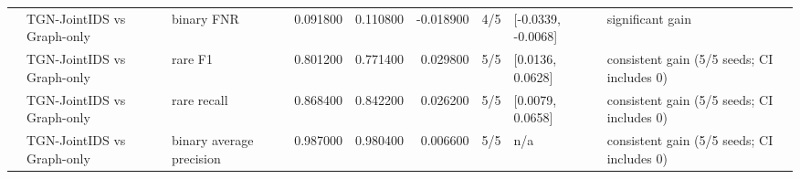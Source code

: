\begin{table}
\begin{tabular}{lllrrrlll}
 & TGN-JointIDS vs Graph-only & binary FNR & 0.091800 & 0.110800 & -0.018900 & 4/5 & [-0.0339, -0.0068] & significant gain \\
 & TGN-JointIDS vs Graph-only & rare F1 & 0.801200 & 0.771400 & 0.029800 & 5/5 & [0.0136, 0.0628] & consistent gain (5/5 seeds; CI includes 0) \\
 & TGN-JointIDS vs Graph-only & rare recall & 0.868400 & 0.842200 & 0.026200 & 5/5 & [0.0079, 0.0658] & consistent gain (5/5 seeds; CI includes 0) \\
 & TGN-JointIDS vs Graph-only & binary average precision & 0.987000 & 0.980400 & 0.006600 & 5/5 & n/a & consistent gain (5/5 seeds; CI includes 0) \\
\cline{1-9}
\bottomrule
\end{tabular}
\end{table}
